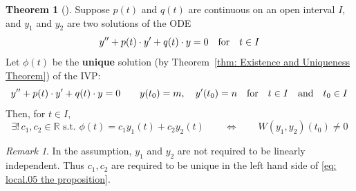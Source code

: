\documentclass[10pt,UTF8]{article}
\newenvironment{theoremBox}
{
  \begin{tcolorbox}[colback=yellow!5!white,colframe=yellow!75!black,parbox=false,before
  upper=\par,before lower=\par]}
  {
\end{tcolorbox}}
\theoremstyle{definition}
\newtheorem{definition inner}{Definition}[section]
\theoremstyle{definition}
\newtheorem{theorem inner}{Theorem}[section]
\newenvironment{theorem}[1][]
{
  \begin{theoremBox}
  \begin{theorem inner}[#1]\hfill\par}
    {
    \end{theorem inner}
\end{theoremBox}}
\theoremstyle{definition}
\newtheorem*{proof inner}{\textit{Proof}}
\theoremstyle{plain}
\newtheorem{tip inner}{Tip}[section]
\theoremstyle{remark}
\newtheorem*{remark}{\textit{Remark}}
\begin{document}
\begin{theorem}
  {}\label{thm: Wronskian and IVP with homogeneous ODE}
  Suppose \(p(t)\) and \(q(t)\) are continuous on an open interval \(I\),
  and \(y_1\) and \(y_2\) are two solutions of the ODE
  \begin{equation}
    y'' + p(t)\cdot y' + q(t)\cdot y = 0
    \qfor t \in I
    \label{eq: local.01 ODE of y}
  \end{equation}
  Let \(\phi(t)\) be the \textbf{unique} solution
  (by Theorem~\ref{thm: Existence and Uniqueness Theorem})
  of the IVP\@:
  \begin{equation}
    y'' + p(t)\cdot y' + q(t)\cdot y = 0
    \qquad y(t_0) = m, \quad y'(t_0) = n
    \qfor t \in I \qand t_0 \in I
    \label{eq: local.02 IVP of y}
  \end{equation}
  Then, for \(t \in I\),
  \begin{equation}
    \exists !\, c_1, c_2 \in \mathbb{R} \text{ s.t. }
    \phi(t) = c_1 y_1(t) + c_2 y_2(t)
    \qquad\iff\qquad
    W(y_1,y_2)(t_0) \neq 0
    \label{eq: local.05 the proposition}
  \end{equation}
\end{theorem}

\begin{remark}
  In the assumption, \(y_1\) and \(y_2\) are not required to be
  linearly independent.
  Thus \(c_1,c_2\) are required to be unique in
  the left hand side of
  \cref{eq: local.05 the proposition}.
\end{remark}
\end{document}
